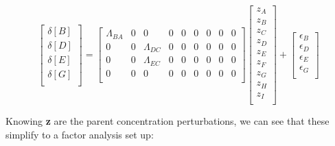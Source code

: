 \documentclass[12pt]{article}
\begin{document}
\[
\begin{bmatrix}
                 \delta[B]  \\
                 \delta[D]  \\
                 \delta[E]  \\
                 \delta[G]  \\
         \end{bmatrix} = \begin{bmatrix}
                 \Lambda_{BA} & 0 & 0 & 0 & 0 & 0 & 0 & 0 & 0  \\
                 0 & 0 & \Lambda_{DC} & 0 & 0 & 0 & 0 & 0 & 0  \\
                 0 & 0 & \Lambda_{EC} & 0 & 0 & 0 & 0 & 0 & 0  \\
                 0 & 0 & 0 & 0 & 0 & 0 & 0 & 0 & 0  \\
         \end{bmatrix} \begin{bmatrix}
                 z_A  \\
                 z_B  \\
                 z_C  \\
                 z_D  \\
                 z_E  \\
                 z_F  \\
                 z_G  \\
                 z_H  \\
                 z_I \\
         \end{bmatrix} +  \begin{bmatrix}
                 \epsilon_B  \\
                 \epsilon_D  \\
                 \epsilon_E  \\
                 \epsilon_G  \\
         \end{bmatrix}
\]

Knowing \textbf{z} are the parent concentration perturbations, we can see that these simplify to a factor analysis set up:
\end{document}
